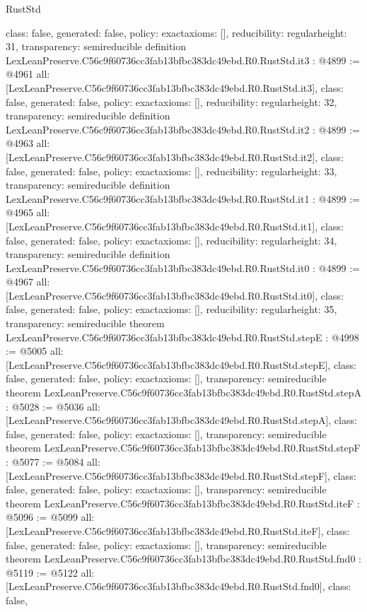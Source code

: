 \begin{lexlean}{RustStd}
\begin{coremodule}
{  class: false,
  generated: false,
  policy: exact{axioms: []},
  reducibility: regular{height: 31},
  transparency: semireducible
}
definition LexLeanPreserve.C56c9f60736cc3fab13bfbc383dc49ebd.R0.RustStd.it3 : @4899 := @4961 {
  all: [LexLeanPreserve.C56c9f60736cc3fab13bfbc383dc49ebd.R0.RustStd.it3],
  class: false,
  generated: false,
  policy: exact{axioms: []},
  reducibility: regular{height: 32},
  transparency: semireducible
}
definition LexLeanPreserve.C56c9f60736cc3fab13bfbc383dc49ebd.R0.RustStd.it2 : @4899 := @4963 {
  all: [LexLeanPreserve.C56c9f60736cc3fab13bfbc383dc49ebd.R0.RustStd.it2],
  class: false,
  generated: false,
  policy: exact{axioms: []},
  reducibility: regular{height: 33},
  transparency: semireducible
}
definition LexLeanPreserve.C56c9f60736cc3fab13bfbc383dc49ebd.R0.RustStd.it1 : @4899 := @4965 {
  all: [LexLeanPreserve.C56c9f60736cc3fab13bfbc383dc49ebd.R0.RustStd.it1],
  class: false,
  generated: false,
  policy: exact{axioms: []},
  reducibility: regular{height: 34},
  transparency: semireducible
}
definition LexLeanPreserve.C56c9f60736cc3fab13bfbc383dc49ebd.R0.RustStd.it0 : @4899 := @4967 {
  all: [LexLeanPreserve.C56c9f60736cc3fab13bfbc383dc49ebd.R0.RustStd.it0],
  class: false,
  generated: false,
  policy: exact{axioms: []},
  reducibility: regular{height: 35},
  transparency: semireducible
}
theorem LexLeanPreserve.C56c9f60736cc3fab13bfbc383dc49ebd.R0.RustStd.stepE : @4998 := @5005 {
  all: [LexLeanPreserve.C56c9f60736cc3fab13bfbc383dc49ebd.R0.RustStd.stepE],
  class: false,
  generated: false,
  policy: exact{axioms: []},
  transparency: semireducible
}
theorem LexLeanPreserve.C56c9f60736cc3fab13bfbc383dc49ebd.R0.RustStd.stepA : @5028 := @5036 {
  all: [LexLeanPreserve.C56c9f60736cc3fab13bfbc383dc49ebd.R0.RustStd.stepA],
  class: false,
  generated: false,
  policy: exact{axioms: []},
  transparency: semireducible
}
theorem LexLeanPreserve.C56c9f60736cc3fab13bfbc383dc49ebd.R0.RustStd.stepF : @5077 := @5084 {
  all: [LexLeanPreserve.C56c9f60736cc3fab13bfbc383dc49ebd.R0.RustStd.stepF],
  class: false,
  generated: false,
  policy: exact{axioms: []},
  transparency: semireducible
}
theorem LexLeanPreserve.C56c9f60736cc3fab13bfbc383dc49ebd.R0.RustStd.iteF : @5096 := @5099 {
  all: [LexLeanPreserve.C56c9f60736cc3fab13bfbc383dc49ebd.R0.RustStd.iteF],
  class: false,
  generated: false,
  policy: exact{axioms: []},
  transparency: semireducible
}
theorem LexLeanPreserve.C56c9f60736cc3fab13bfbc383dc49ebd.R0.RustStd.fnd0 : @5119 := @5122 {
  all: [LexLeanPreserve.C56c9f60736cc3fab13bfbc383dc49ebd.R0.RustStd.fnd0],
  class: false,
}
\end{coremodule}
\end{lexlean}
